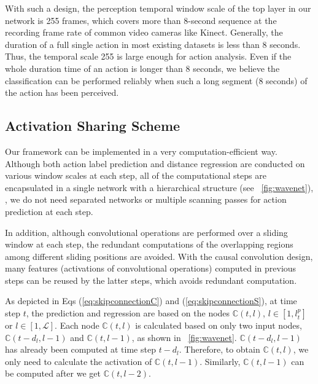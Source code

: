 \documentclass[10pt,twocolumn,letterpaper]{article}
\begin{document}
With such a design, the perception temporal window scale of the top layer in our network is 255 frames,
which covers more than 8-second sequence at the recording frame rate of common video cameras like Kinect.
Generally, the duration of a full single action in most existing datasets is less than 8 seconds.
Thus, the temporal scale 255 is large enough for action analysis.
Even if the whole duration time of an action is longer than 8 seconds,
we believe the classification can be performed reliably when such a long segment (8 seconds) of the action has been perceived.











\subsection{Activation Sharing Scheme}
\label{sec:method:activationshare}



Our framework can be implemented in a very computation-efficient way.
Although both action label prediction and distance regression are conducted on various window scales at each step,
all of the computational steps are encapsulated in a single network with a hierarchical structure
(see \figurename{~\ref{fig:wavenet}}),
\ie, we do not need separated networks or multiple scanning passes for action prediction at each step. 

In addition, although convolutional operations are performed over a sliding window at each step,
the redundant computations of the overlapping regions among different sliding positions are avoided.
With the causal convolution design,
many features (activations of convolutional operations)
computed in previous steps can be reused by the latter steps,
which avoids redundant computation.

As depicted in Eqs (\ref{eq:skipconnectionC}) and (\ref{eq:skipconnectionS}),
at time step $t$, the prediction and regression are based on the nodes $\mathbb{C}(t,l)$,
$l\in[1,l_t^p]$ or $l\in[1,\mathcal{L}]$.
Each node $\mathbb{C}(t,l)$ is calculated based on only two input nodes,
$\mathbb{C}(t-d_{l},l-1)$ and $\mathbb{C}(t,l-1)$, as shown in \figurename{~\ref{fig:wavenet}}.
$\mathbb{C}(t-d_{l},l-1)$ has already been computed at time step $t-d_{l}$.
Therefore, to obtain $\mathbb{C}(t,l)$, we only need to calculate the activation of $\mathbb{C}(t,l-1)$.
Similarly, $\mathbb{C}(t,l-1)$ can be computed after we get $\mathbb{C}(t,l-2)$.
\end{document}
